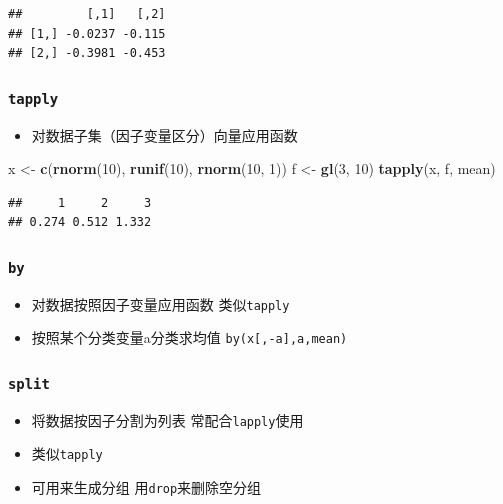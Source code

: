 \documentclass[]{book}
\newenvironment{Shaded}{\begin{snugshade}}{\end{snugshade}}
\newcommand{\DecValTok}[1]{\textcolor[rgb]{0.00,0.00,0.81}{#1}}
\newcommand{\KeywordTok}[1]{\textcolor[rgb]{0.13,0.29,0.53}{\textbf{#1}}}
\newcommand{\NormalTok}[1]{#1}
\newcommand{\StringTok}[1]{\textcolor[rgb]{0.31,0.60,0.02}{#1}}
\providecommand{\tightlist}{%
  \setlength{\itemsep}{0pt}\setlength{\parskip}{0pt}}
\begin{document}
\begin{verbatim}
##         [,1]   [,2]
## [1,] -0.0237 -0.115
## [2,] -0.3981 -0.453
\end{verbatim}

\hypertarget{tapply}{%
\subsubsection{\texorpdfstring{\texttt{tapply}}{tapply}}\label{tapply}}

\begin{itemize}
\tightlist
\item
  对数据子集（因子变量区分）向量应用函数
\end{itemize}

\begin{Shaded}
\begin{Highlighting}[]
\NormalTok{x <-}\StringTok{ }\KeywordTok{c}\NormalTok{(}\KeywordTok{rnorm}\NormalTok{(}\DecValTok{10}\NormalTok{), }\KeywordTok{runif}\NormalTok{(}\DecValTok{10}\NormalTok{), }\KeywordTok{rnorm}\NormalTok{(}\DecValTok{10}\NormalTok{, }\DecValTok{1}\NormalTok{))}
\NormalTok{f <-}\StringTok{ }\KeywordTok{gl}\NormalTok{(}\DecValTok{3}\NormalTok{, }\DecValTok{10}\NormalTok{)}
\KeywordTok{tapply}\NormalTok{(x, f, mean)}
\end{Highlighting}
\end{Shaded}

\begin{verbatim}
##     1     2     3 
## 0.274 0.512 1.332
\end{verbatim}

\hypertarget{by}{%
\subsubsection{\texorpdfstring{\texttt{by}}{by}}\label{by}}

\begin{itemize}
\tightlist
\item
  对数据按照因子变量应用函数 类似\texttt{tapply}
\item
  按照某个分类变量a分类求均值 \texttt{by(x{[},-a{]},a,mean)}
\end{itemize}

\hypertarget{split}{%
\subsubsection{\texorpdfstring{\texttt{split}}{split}}\label{split}}

\begin{itemize}
\tightlist
\item
  将数据按因子分割为列表 常配合\texttt{lapply}使用
\item
  类似\texttt{tapply}
\item
  可用来生成分组 用\texttt{drop}来删除空分组
\end{itemize}
\end{document}

